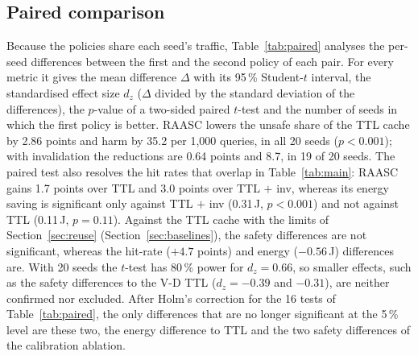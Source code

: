 \documentclass[journal]{IEEEtran}
\newcommand{\pct}{\,\%}
\begin{document}
\subsection{Paired comparison}\label{sec:paired}
Because the policies share each seed's traffic, Table~\ref{tab:paired} analyses the per-seed differences between the first and the second policy of each pair. For every metric it gives the mean difference $\Delta$ with its 95\pct{} Student-$t$ interval, the standardised effect size $d_z$ ($\Delta$ divided by the standard deviation of the differences), the $p$-value of a two-sided paired $t$-test and the number of seeds in which the first policy is better. RAASC lowers the unsafe share of the TTL cache by 2.86 points and harm by 35.2 per 1,000 queries, in all 20 seeds ($p<0.001$); with invalidation the reductions are 0.64 points and 8.7, in 19 of 20 seeds. The paired test also resolves the hit rates that overlap in Table~\ref{tab:main}: RAASC gains 1.7 points over TTL and 3.0 points over TTL $+$ inv, whereas its energy saving is significant only against TTL $+$ inv (0.31\,J, $p<0.001$) and not against TTL (0.11\,J, $p=0.11$). Against the TTL cache with the limits of Section~\ref{sec:reuse} (Section~\ref{sec:baselines}), the safety differences are not significant, whereas the hit-rate ($+4.7$ points) and energy ($-0.56$\,J) differences are. With 20 seeds the $t$-test has 80\pct{} power for $d_z=0.66$, so smaller effects, such as the safety differences to the V-D TTL ($d_z=-0.39$ and $-0.31$), are neither confirmed nor excluded. After Holm's correction for the 16 tests of Table~\ref{tab:paired}, the only differences that are no longer significant at the 5\pct{} level are these two, the energy difference to TTL and the two safety differences of the calibration ablation.
\end{document}

